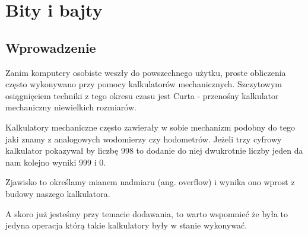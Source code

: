 \setchapterpreamble[u]{\margintoc}
\chapter{Bity i bajty}

\section{Wprowadzenie}

Zanim komputery osobiste weszły do powszechnego użytku,
proste obliczenia często wykonywano przy pomocy kalkulatorów
mechanicznych. Szczytowym osiągnięciem techniki z tego okresu
czasu jest Curta - przenośny kalkulator mechaniczny niewielkich rozmiarów.


Kalkulatory mechaniczne często zawierały w sobie mechanizm
podobny do tego jaki znamy z analogowych wodomierzy czy hodometrów.
Jeżeli trzy cyfrowy kalkulator pokazywał by liczbę 998 to 
dodanie do niej dwukrotnie liczby jeden da nam kolejno wyniki 999 i 0.


Zjawisko to określamy mianem nadmiaru (ang. overflow) i
wynika ono wprost z budowy naszego kalkulatora.

A skoro już jesteśmy przy temacie dodawania, 
to warto wspomnieć że była to jedyna operacja
którą takie kalkulatory były w stanie wykonywać.


% 